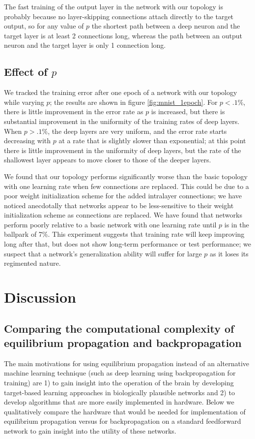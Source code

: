 \documentclass[utf8]{frontiersSCNS}
\begin{document}
The fast training of the output layer in the network with our topology is probably because no layer-skipping connections attach directly to the target output, so for any value of $p$ the shortest path between a deep neuron and the target layer is at least 2 connections long, whereas the path between an output neuron and the target layer is only 1 connection long.

\subsection{Effect of $p$}
\label{sec:mnist_1epoch}

We tracked the training error after one epoch of a network with our topology while varying $p$; the results are shown in figure \ref{fig:mnist_1epoch}. For $p<.1\%$, there is little improvement in the error rate as $p$ is increased, but there is substantial improvement in the uniformity of the training rates of deep layers. When $p>.1\%$, the deep layers are very uniform, and the error rate starts decreasing with $p$ at a rate that is slightly slower than exponential; at this point there is little improvement in the uniformity of deep layers, but the rate of the shallowest layer appears to move closer to those of the deeper layers.

We found that our topology performs significantly worse than the basic topology with one learning rate when few connections are replaced. This could be due to a poor weight initialization scheme for the added intralayer connections; we have noticed anecdotally that networks appear to be less-sensitive to their weight initialization scheme as connections are replaced. We have found that networks perform poorly relative to a basic network with one learning rate until $p$ is in the ballpark of 7\%. This experiment suggests that training rate will keep improving long after that, but does not show long-term performance or test performance; we suspect that a network's generalization ability will suffer for large $p$ as it loses its regimented nature.

\section{Discussion}

\subsection{Comparing the computational complexity of equilibrium propagation and backpropagation}
\label{sec:comparison}
The main motivations for using equilibrium propagation instead of an alternative 
machine learning technique (such as deep learning using backpropagation for training) are 1) to 
gain insight into the operation of the brain by developing target-based learning approaches in 
biologically plausible networks and 2) to develop algorithms that are more easily implemented in 
hardware. Below we qualitatively compare the hardware that would be needed for implementation of 
equilibrium propagation versus for backpropagation on a standard feedforward network to gain 
insight into the utility of these networks.
\end{document}
